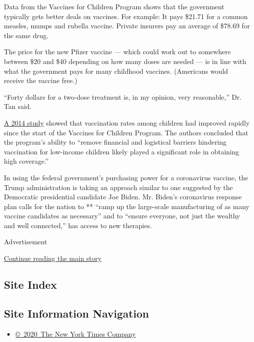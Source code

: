Data from the Vaccines for Children Program shows that the government
typically gets better deals on vaccines. For example: It pays \$21.71
for a common measles, mumps and rubella vaccine. Private insurers pay an
average of \$78.69 for the same drug.

The price for the new Pfizer vaccine --- which could work out to
somewhere between \$20 and \$40 depending on how many doses are needed
--- is in line with what the government pays for many childhood
vaccines. (Americans would receive the vaccine free.)

``Forty dollars for a two-dose treatment is, in my opinion, very
reasonable,'' Dr. Tan said.

\href{https://www.cdc.gov/mmwr/preview/mmwrhtml/mm6316a4.htm}{A 2014
study} showed that vaccination rates among children had improved rapidly
since the start of the Vaccines for Children Program. The authors
concluded that the program's ability to ``remove financial and
logistical barriers hindering vaccination for low-income children likely
played a significant role in obtaining high coverage.''

In using the federal government's purchasing power for a coronavirus
vaccine, the Trump administration is taking an approach similar to one
suggested by the Democratic presidential candidate Joe Biden. Mr.
Biden's coronavirus response plan calls for the nation to ** ``ramp up
the large-scale manufacturing of as many vaccine candidates as
necessary'' and to ``ensure everyone, not just the wealthy and well
connected,'' has access to new therapies.

Advertisement

\protect\hyperlink{after-bottom}{Continue reading the main story}

\hypertarget{site-index}{%
\subsection{Site Index}\label{site-index}}

\hypertarget{site-information-navigation}{%
\subsection{Site Information
Navigation}\label{site-information-navigation}}

\begin{itemize}
\tightlist
\item
  \href{https://help.nytimes3xbfgragh.onion/hc/en-us/articles/115014792127-Copyright-notice}{©~2020~The
  New York Times Company}
\end{itemize}

